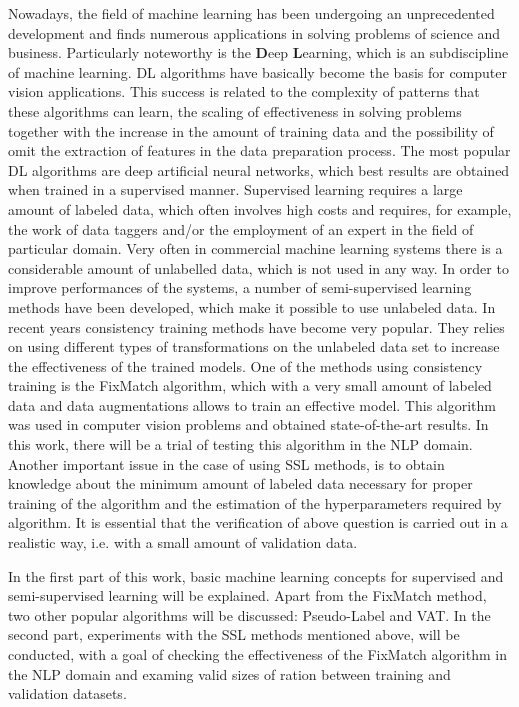 \documentclass[12pt]{article}
\theoremstyle{definition}
\DeclareRobustCommand{\[}{\begin{equation}}
\DeclareRobustCommand{\]}{\end{equation}}
\begin{document}
Nowadays, the field of machine learning has been undergoing an unprecedented development and finds numerous applications in solving problems of science and business. Particularly noteworthy is the \textbf{D}eep \textbf{L}earning, which is an subdiscipline of machine learning. DL algorithms have basically become the basis for computer vision applications. This success is related to the complexity of patterns that these algorithms can learn, the scaling of effectiveness in solving problems together with the increase in the amount of training data and the possibility of omit the extraction of features in the data preparation process. The most popular DL algorithms are deep artificial neural networks, which best results are obtained when trained in a supervised manner. Supervised learning requires a large amount of labeled data, which often involves high costs and requires, for example, the work of data taggers and/or the employment of an expert in the field of particular domain.
Very often in commercial machine learning systems there is a considerable amount of unlabelled data, which is not used in any way. In order to improve performances of the systems, a number of semi-supervised learning methods have been developed, which make it possible to use unlabeled data. In recent years consistency training methods have become very popular. They relies on using different types of transformations on the unlabeled data set to increase the effectiveness of the trained models. One of the methods using consistency training is the FixMatch algorithm, which with a very small amount of labeled data and data augmentations allows to train an effective model. This algorithm was used in computer vision problems and obtained state-of-the-art results. In this work, there will be a trial of testing this algorithm in the NLP domain. Another important issue in the case of using SSL methods, is to obtain knowledge about the minimum amount of labeled data necessary for proper training of the algorithm and the estimation of the hyperparameters required by algorithm. It is essential that the verification of above question is carried out in a realistic way, i.e. with a small amount of validation data. \par
In the first part of this work, basic machine learning concepts for supervised and semi-supervised learning will be explained. Apart from the FixMatch method, two other popular algorithms will be discussed: Pseudo-Label and VAT.
In the second part, experiments with the SSL methods mentioned above, will be conducted, with a goal of checking the effectiveness of the FixMatch algorithm in the NLP domain and examing valid sizes of ration between training and validation datasets.
\end{document}
